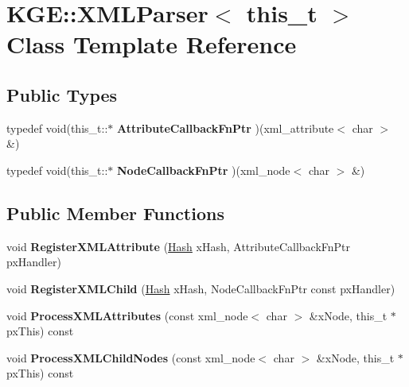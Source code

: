 \hypertarget{class_k_g_e_1_1_x_m_l_parser}{\section{K\-G\-E\-:\-:X\-M\-L\-Parser$<$ this\-\_\-t $>$ Class Template Reference}
\label{class_k_g_e_1_1_x_m_l_parser}
}
\subsection*{Public Types}
\begin{DoxyCompactItemize}
\item 
\hypertarget{class_k_g_e_1_1_x_m_l_parser_a2fdac7b18d10dbcce15098741030ed79}{typedef void(this\-\_\-t\-::$\ast$ {\bfseries Attribute\-Callback\-Fn\-Ptr} )(xml\-\_\-attribute$<$ char $>$ \&)}\label{class_k_g_e_1_1_x_m_l_parser_a2fdac7b18d10dbcce15098741030ed79}

\item 
\hypertarget{class_k_g_e_1_1_x_m_l_parser_a2052540602e1b0239dd28128cc64cee8}{typedef void(this\-\_\-t\-::$\ast$ {\bfseries Node\-Callback\-Fn\-Ptr} )(xml\-\_\-node$<$ char $>$ \&)}\label{class_k_g_e_1_1_x_m_l_parser_a2052540602e1b0239dd28128cc64cee8}

\end{DoxyCompactItemize}
\subsection*{Public Member Functions}
\begin{DoxyCompactItemize}
\item 
\hypertarget{class_k_g_e_1_1_x_m_l_parser_a582546413cfe245053543f226db9d5bf}{void {\bfseries Register\-X\-M\-L\-Attribute} (\hyperlink{class_k_g_e_1_1_hash}{Hash} x\-Hash, Attribute\-Callback\-Fn\-Ptr px\-Handler)}\label{class_k_g_e_1_1_x_m_l_parser_a582546413cfe245053543f226db9d5bf}

\item 
\hypertarget{class_k_g_e_1_1_x_m_l_parser_ad97fd3ec90a7f3539d9d97d9dbb26380}{void {\bfseries Register\-X\-M\-L\-Child} (\hyperlink{class_k_g_e_1_1_hash}{Hash} x\-Hash, Node\-Callback\-Fn\-Ptr const px\-Handler)}\label{class_k_g_e_1_1_x_m_l_parser_ad97fd3ec90a7f3539d9d97d9dbb26380}

\item 
\hypertarget{class_k_g_e_1_1_x_m_l_parser_a50577da16bfde8d4d085e735d2f713d3}{void {\bfseries Process\-X\-M\-L\-Attributes} (const xml\-\_\-node$<$ char $>$ \&x\-Node, this\-\_\-t $\ast$px\-This) const }\label{class_k_g_e_1_1_x_m_l_parser_a50577da16bfde8d4d085e735d2f713d3}

\item 
\hypertarget{class_k_g_e_1_1_x_m_l_parser_ac5ea86ba238fae56ed22f5be4f7bdfb8}{void {\bfseries Process\-X\-M\-L\-Child\-Nodes} (const xml\-\_\-node$<$ char $>$ \&x\-Node, this\-\_\-t $\ast$px\-This) const }\label{class_k_g_e_1_1_x_m_l_parser_ac5ea86ba238fae56ed22f5be4f7bdfb8}

\end{DoxyCompactItemize}
